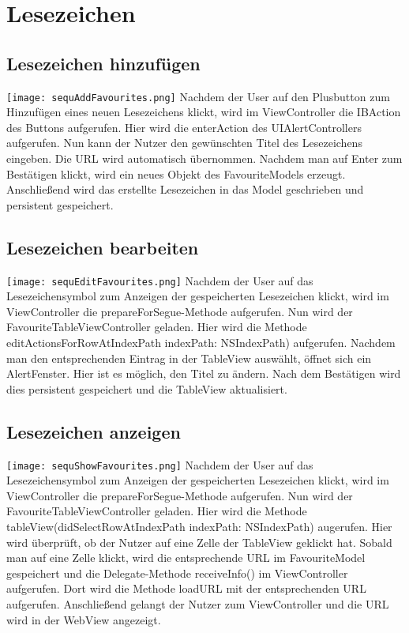 \section{Lesezeichen}
\subsection{Lesezeichen hinzufügen}
\texttt{[image: sequAddFavourites.png]}
Nachdem der User auf den Plusbutton zum Hinzufügen eines neuen Lesezeichens klickt, wird im ViewController die IBAction des Buttons aufgerufen. Hier wird die enterAction des UIAlertControllers aufgerufen. Nun kann der Nutzer den gewünschten Titel des Lesezeichens eingeben. Die URL wird automatisch übernommen. Nachdem man auf Enter zum Bestätigen klickt, wird ein neues Objekt des FavouriteModels erzeugt. Anschließend wird das erstellte Lesezeichen in das Model geschrieben und persistent gespeichert.
\pagebreak

\subsection{Lesezeichen bearbeiten}
\texttt{[image: sequEditFavourites.png]}
Nachdem der User auf das Lesezeichensymbol zum Anzeigen der gespeicherten Lesezeichen klickt, wird im ViewController die prepareForSegue-Methode aufgerufen. Nun wird der FavouriteTableViewController geladen. Hier wird die Methode editActionsForRowAtIndexPath indexPath: NSIndexPath) aufgerufen. Nachdem man den entsprechenden Eintrag in der TableView auswählt, öffnet sich ein AlertFenster. Hier ist es möglich, den Titel zu ändern. Nach dem Bestätigen wird dies persistent gespeichert und die TableView aktualisiert.
\pagebreak

\subsection{Lesezeichen anzeigen}
\texttt{[image: sequShowFavourites.png]}
Nachdem der User auf das Lesezeichensymbol zum Anzeigen der gespeicherten Lesezeichen klickt, wird im ViewController die prepareForSegue-Methode aufgerufen. Nun wird der FavouriteTableViewController geladen. Hier wird die Methode tableView(didSelectRowAtIndexPath indexPath: NSIndexPath) augerufen. Hier wird überprüft, ob der Nutzer auf eine Zelle der TableView geklickt hat. Sobald man auf eine Zelle klickt, wird die entsprechende URL im FavouriteModel gespeichert und die Delegate-Methode receiveInfo() im ViewController aufgerufen. Dort wird die Methode loadURL mit der entsprechenden URL aufgerufen. Anschließend gelangt der Nutzer zum ViewController und die URL wird in der WebView angezeigt.
\pagebreak

